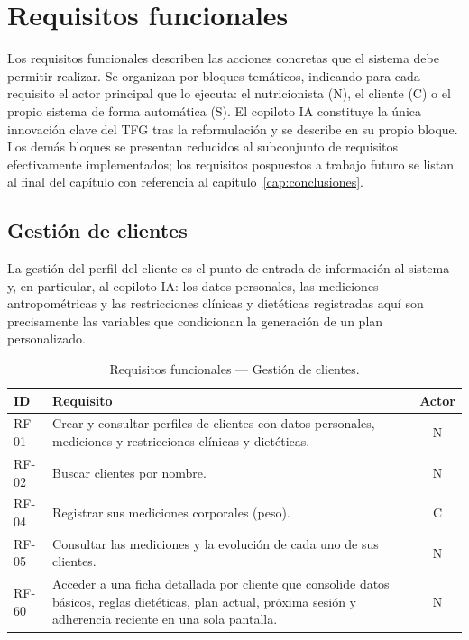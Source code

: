 \section{Requisitos funcionales}
\label{sec:rf}

Los requisitos funcionales describen las acciones concretas que el sistema debe permitir realizar. Se organizan por bloques temáticos, indicando para cada requisito el actor principal que lo ejecuta: el nutricionista (N), el cliente (C) o el propio sistema de forma automática (S). El copiloto IA constituye la única innovación clave del TFG tras la reformulación y se describe en su propio bloque. Los demás bloques se presentan reducidos al subconjunto de requisitos efectivamente implementados; los requisitos pospuestos a trabajo futuro se listan al final del capítulo con referencia al capítulo~\ref{cap:conclusiones}.

\subsection{Gestión de clientes}

La gestión del perfil del cliente es el punto de entrada de información al sistema y, en particular, al copiloto IA: los datos personales, las mediciones antropométricas y las restricciones clínicas y dietéticas registradas aquí son precisamente las variables que condicionan la generación de un plan personalizado.

\begin{table}[htbp]
\centering
\small
\begin{tabular}{|l|p{10.5cm}|c|}
\hline
\textbf{ID} & \textbf{Requisito} & \textbf{Actor} \\
\hline
RF-01 & Crear y consultar perfiles de clientes con datos personales, mediciones y restricciones clínicas y dietéticas. & N \\
\hline
RF-02 & Buscar clientes por nombre. & N \\
\hline
RF-04 & Registrar sus mediciones corporales (peso). & C \\
\hline
RF-05 & Consultar las mediciones y la evolución de cada uno de sus clientes. & N \\
\hline
RF-60 & Acceder a una ficha detallada por cliente que consolide datos básicos, reglas dietéticas, plan actual, próxima sesión y adherencia reciente en una sola pantalla. & N \\
\hline
\end{tabular}
\caption{Requisitos funcionales --- Gestión de clientes.}
\label{tab:rf-clientes}
\end{table}

